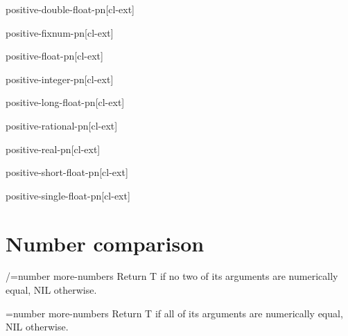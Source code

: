 \documentclass[10pt,english]{book}
\begin{document}
\begin{function}{positive-double-float-p}{n}[cl-ext]
  
\end{function}

\begin{function}{positive-fixnum-p}{n}[cl-ext]
  
\end{function}

\begin{function}{positive-float-p}{n}[cl-ext]
  
\end{function}

\begin{function}{positive-integer-p}{n}[cl-ext]
  
\end{function}

\begin{function}{positive-long-float-p}{n}[cl-ext]
  
\end{function}

\begin{function}{positive-rational-p}{n}[cl-ext]
  
\end{function}

\begin{function}{positive-real-p}{n}[cl-ext]
  
\end{function}

\begin{function}{positive-short-float-p}{n}[cl-ext]
  
\end{function}

\begin{function}{positive-single-float-p}{n}[cl-ext]
  
\end{function}

\section{Number comparison}
\label{sec:number-comparison}

\begin{function}{/=}{number \rest more-numbers}
  Return T if no two of its arguments are numerically equal, NIL otherwise.
\end{function}

\begin{function}{=}{number \rest more-numbers}
  Return T if all of its arguments are numerically equal, NIL otherwise.
\end{function}
\end{document}
